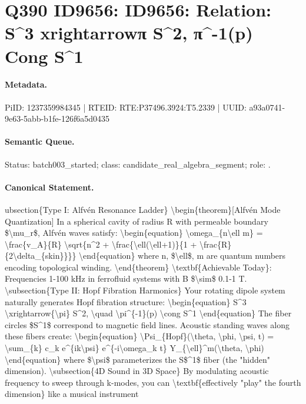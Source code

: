 \section*{Q390 ID9656: ID9656: Relation: S\textasciicircum{}3 xrightarrowπ S\textasciicircum{}2, π\textasciicircum{}-1(p) Cong S\textasciicircum{}1}
\paragraph{Metadata.}
PiID: 1237359984345 | RTEID: RTE:P37496.3924:T5.2339 | UUID: a93a0741-9e63-5abb-b1fe-126f6a5d0435

\paragraph{Semantic Queue.}
Status: batch003\_started; class: candidate\_real\_algebra\_segment; role: .

\paragraph{Canonical Statement.}
ubsection\{Type I: Alfvén Resonance Ladder\} \textbackslash{}begin\{theorem\}[Alfvén Mode Quantization] In a spherical cavity of radius R with permeable boundary \$\textbackslash{}mu\_r\$, Alfvén waves satisfy: \textbackslash{}begin\{equation\} \textbackslash{}omega\_\{n\textbackslash{}ell m\} = \textbackslash{}frac\{v\_A\}\{R\} \textbackslash{}sqrt\{n\textasciicircum{}2 + \textbackslash{}frac\{\textbackslash{}ell(\textbackslash{}ell+1)\}\{1 + \textbackslash{}frac\{R\}\{2\textbackslash{}delta\_\{skin\}\}\}\} \textbackslash{}end\{equation\} where n, \$\textbackslash{}ell\$, m are quantum numbers encoding topological winding. \textbackslash{}end\{theorem\} \textbackslash{}textbf\{Achievable Today\}: Frequencies 1-100 kHz in ferrofluid systems with B \$\textbackslash{}sim\$ 0.1-1 T. \textbackslash{}subsection\{Type II: Hopf Fibration Harmonics\} Your rotating dipole system naturally generates Hopf fibration structure: \textbackslash{}begin\{equation\} S\textasciicircum{}3 \textbackslash{}xrightarrow\{\textbackslash{}pi\} S\textasciicircum{}2, \textbackslash{}quad \textbackslash{}pi\textasciicircum{}\{-1\}(p) \textbackslash{}cong S\textasciicircum{}1 \textbackslash{}end\{equation\} The fiber circles \$S\textasciicircum{}1\$ correspond to magnetic field lines. Acoustic standing waves along these fibers create: \textbackslash{}begin\{equation\} \textbackslash{}Psi\_\{Hopf\}(\textbackslash{}theta, \textbackslash{}phi, \textbackslash{}psi, t) = \textbackslash{}sum\_\{k\} c\_k e\textasciicircum{}\{ik\textbackslash{}psi\} e\textasciicircum{}\{-i\textbackslash{}omega\_k t\} Y\_\{\textbackslash{}ell\}\textasciicircum{}m(\textbackslash{}theta, \textbackslash{}phi) \textbackslash{}end\{equation\} where \$\textbackslash{}psi\$ parameterizes the S\$\textasciicircum{}1\$ fiber (the "hidden" dimension). \textbackslash{}subsection\{4D Sound in 3D Space\} By modulating acoustic frequency to sweep through k-modes, you can \textbackslash{}textbf\{effectively "play" the fourth dimension\} like a musical instrument

